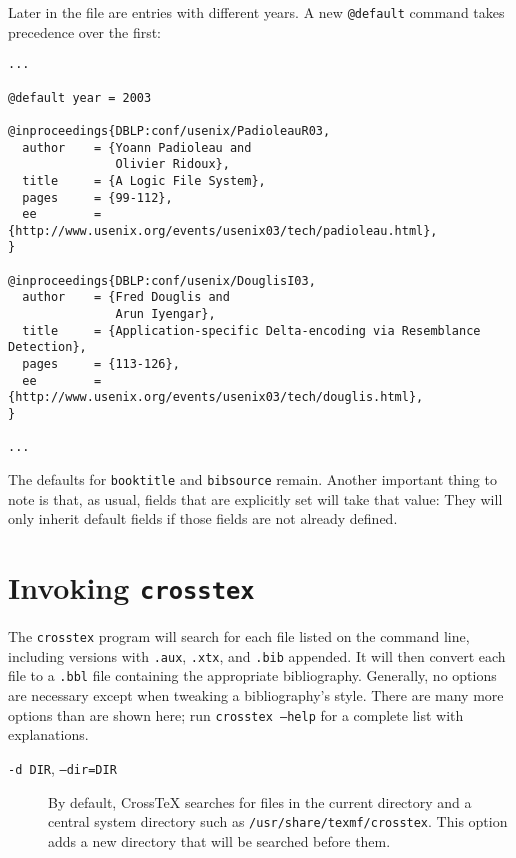 \documentclass{article}
\newcommand{\XTeX}{Cross\TeX}
\begin{document}
Later in the file are entries with different years. A new \texttt{@default} command takes precedence over the first:

\begin{small}\begin{verbatim}
...

@default year = 2003

@inproceedings{DBLP:conf/usenix/PadioleauR03,
  author    = {Yoann Padioleau and
               Olivier Ridoux},
  title     = {A Logic File System},
  pages     = {99-112},
  ee        = {http://www.usenix.org/events/usenix03/tech/padioleau.html},
}

@inproceedings{DBLP:conf/usenix/DouglisI03,
  author    = {Fred Douglis and
               Arun Iyengar},
  title     = {Application-specific Delta-encoding via Resemblance Detection},
  pages     = {113-126},
  ee        = {http://www.usenix.org/events/usenix03/tech/douglis.html},
}

...
\end{verbatim}\end{small}

The defaults for \texttt{booktitle} and \texttt{bibsource} remain. Another important thing to note is that, as usual, fields that are explicitly set will take that value: They will only inherit default fields if those fields are not already defined.



\section{Invoking \texttt{crosstex}}

The \texttt{crosstex} program will search for each file listed on the command line, including versions with \texttt{.aux}, \texttt{.xtx}, and \texttt{.bib} appended. It will then convert each file to a \texttt{.bbl} file containing the appropriate bibliography. Generally, no options are necessary except when tweaking a bibliography's style. There are many more options than are shown here; run \texttt{crosstex --help} for a complete list with explanations.

\begin{description}
\item[\texttt{-d DIR}, \texttt{--dir=DIR}]
By default, \XTeX{} searches for files in the current directory and a central system directory such as \texttt{/usr/share/texmf/crosstex}. This option adds a new directory that will be searched before them.
\end{description}
\end{document}
